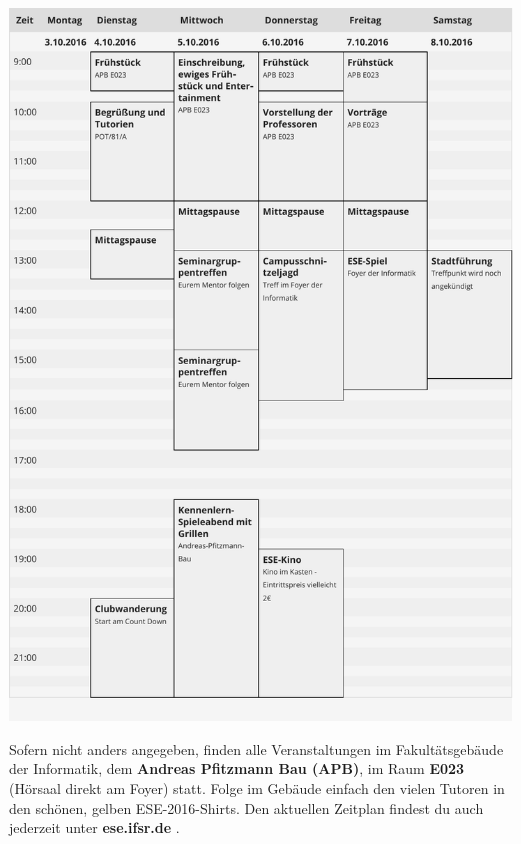 %



\vfill
\centering
\includegraphics[height=.60\dimen108,keepaspectratio]{img/zeitplan.pdf}%
\vfill

Sofern nicht anders angegeben, finden alle Veranstaltungen im Fakultätsgebäude der Informatik, dem
\textbf{Andreas Pfitzmann Bau (APB)}, im Raum \textbf{E023} (Hörsaal direkt am Foyer) statt.
Folge im Gebäude einfach den vielen Tutoren in den schönen, gelben ESE-2016-Shirts.
Den aktuellen Zeitplan findest du auch jederzeit unter \textbf{ese.ifsr.de} .


\mbox{}

